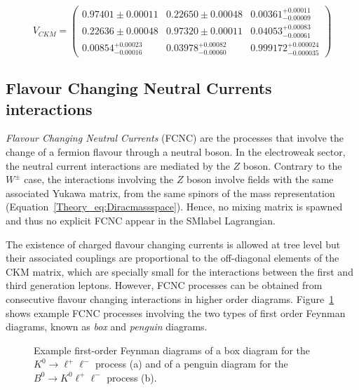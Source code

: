 \begin{equation}
        V_{CKM}= \begin{pmatrix} 0.97401 \pm 0.00011 & 0.22650 \pm 0.00048 & 0.00361^{+0.00011}_{-0.00009} \\ 0.22636 \pm 0.00048 & 0.97320 \pm 0.00011 & 0.04053^{+0.00083}_{-0.00061} \\ 0.00854^{+0.00023}_{-0.00016} & 0.03978^{+0.00082}_{-0.00060} & 0.999172^{+0.000024}_{-0.000035} \end{pmatrix}
\end{equation}

\subsection{Flavour Changing Neutral Currents interactions}
\label{Theory_SMsubsec:FCNC}
\textit{Flavour Changing Neutral Currents} (FCNC) are the processes that involve the change of a fermion flavour through a neutral boson. In the electroweak sector, the neutral current interactions are mediated by the $Z$ boson. Contrary to the $W^\pm$ case, the interactions involving the $Z$ boson involve fields with the same associated Yukawa matrix, from the same spinors of the mass representation (Equation~\ref{Theory_eq:Diracmassspace}). Hence, no mixing matrix is spawned and thus no explicit FCNC appear in the \acrshort{SMlabel} Lagrangian.

The existence of charged flavour changing currents is allowed at tree level but their associated couplings are proportional to the off-diagonal elements of the CKM matrix, which are specially small for the interactions between the first and third generation leptons. However, FCNC processes can be obtained from consecutive flavour changing interactions in higher order diagrams. Figure~\ref{figSM:FCNCdiagrams} shows example FCNC processes involving the two types of first order Feynman diagrams, known as \textit{box} and \textit{penguin} diagrams.

\begin{figure}[htbp]
    \RawFloats
    \begin{center}
        \quad
        \caption{
            Example first-order Feynman diagrams of a box diagram for the $K^0\to\ell^+\ell^-$ process (a) and of a penguin diagram for the $B^0\to K^0\ell^+\ell^-$ process (b). 
    }
    \label{figSM:FCNCdiagrams}
    \end{center}
\end{figure}

